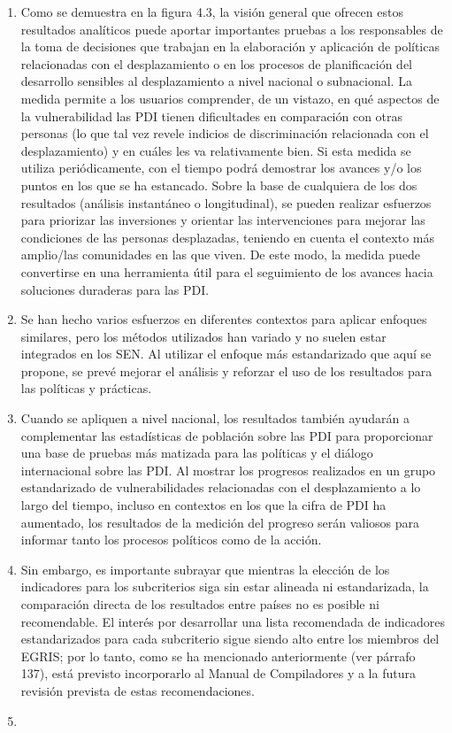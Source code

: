 \documentclass[
]{book}
\begin{document}
\begin{enumerate}
\def\labelenumi{\arabic{enumi}.}
\item
  Como se demuestra en la figura 4.3, la visión general que ofrecen estos resultados analíticos puede aportar importantes pruebas a los responsables de la toma de decisiones que trabajan en la elaboración y aplicación de políticas relacionadas con el desplazamiento o en los procesos de planificación del desarrollo sensibles al desplazamiento a nivel nacional o subnacional. La medida permite a los usuarios comprender, de un vistazo, en qué aspectos de la vulnerabilidad las PDI tienen dificultades en comparación con otras personas (lo que tal vez revele indicios de discriminación relacionada con el desplazamiento) y en cuáles les va relativamente bien. Si esta medida se utiliza periódicamente, con el tiempo podrá demostrar los avances y/o los puntos en los que se ha estancado. Sobre la base de cualquiera de los dos resultados (análisis instantáneo o longitudinal), se pueden realizar esfuerzos para priorizar las inversiones y orientar las intervenciones para mejorar las condiciones de las personas desplazadas, teniendo en cuenta el contexto más amplio/las comunidades en las que viven. De este modo, la medida puede convertirse en una herramienta útil para el seguimiento de los avances hacia soluciones duraderas para las PDI.
\item
  Se han hecho varios esfuerzos en diferentes contextos para aplicar enfoques similares, pero los métodos utilizados han variado y no suelen estar integrados en los SEN. Al utilizar el enfoque más estandarizado que aquí se propone, se prevé mejorar el análisis y reforzar el uso de los resultados para las políticas y prácticas.
\item
  Cuando se apliquen a nivel nacional, los resultados también ayudarán a complementar las estadísticas de población sobre las PDI para proporcionar una base de pruebas más matizada para las políticas y el diálogo internacional sobre las PDI. Al mostrar los progresos realizados en un grupo estandarizado de vulnerabilidades relacionadas con el desplazamiento a lo largo del tiempo, incluso en contextos en los que la cifra de PDI ha aumentado, los resultados de la medición del progreso serán valiosos para informar tanto los procesos políticos como de la acción.
\item
  Sin embargo, es importante subrayar que mientras la elección de los indicadores para los subcriterios siga sin estar alineada ni estandarizada, la comparación directa de los resultados entre países no es posible ni recomendable. El interés por desarrollar una lista recomendada de indicadores estandarizados para cada subcriterio sigue siendo alto entre los miembros del EGRIS; por lo tanto, como se ha mencionado anteriormente (ver párrafo 137), está previsto incorporarlo al Manual de Compiladores y a la futura revisión prevista de estas recomendaciones.
\item ~
  \hypertarget{desagregaciuxf3n-de-datos}{%
}
\end{enumerate}
\end{document}
